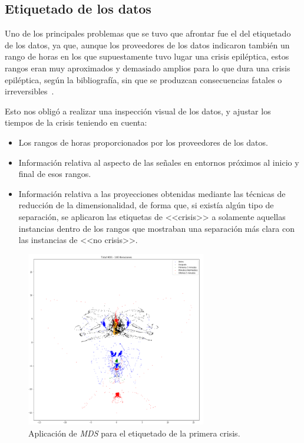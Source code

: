 \subsection{Etiquetado de los datos}

Uno de los principales problemas que se tuvo que afrontar fue el del etiquetado de los datos, ya que, aunque los proveedores de los datos indicaron también un rango de horas en los que supuestamente tuvo lugar una crisis epiléptica, estos rangos eran muy aproximados y demasiado amplios para lo que dura una crisis epiléptica, según la bibliografía, sin que se produzcan consecuencias fatales o irreversibles~\cite{epilepsia}. 

Esto nos obligó a realizar una inspección visual de los datos, y ajustar los tiempos de la crisis teniendo en cuenta: 

\begin{itemize}
	\item Los rangos de horas proporcionados por los proveedores de los datos. 
	\item Información relativa al aspecto de las señales en entornos próximos al inicio y final de esos rangos. 
	\item Información relativa a las proyecciones obtenidas mediante las técnicas de reducción de la dimensionalidad, de forma que, si existía algún tipo de separación, se aplicaron las etiquetas de <<crisis>> a solamente aquellas instancias dentro de los rangos que mostraban una separación más clara con las instancias de <<no crisis>>. 
\end{itemize}

\begin{figure}
	\centering
	\includegraphics[width=0.7\textwidth]{../img/mdsetiquetado.png}
	\caption{Aplicación de \textit{MDS} para el etiquetado de la primera crisis.}
	\label{fig:mdsetiquetado}
\end{figure}

